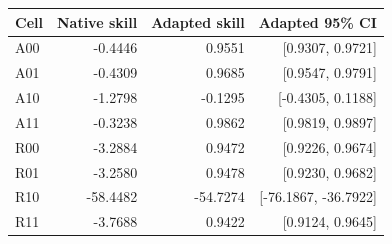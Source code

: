 \begin{tabular}{lrrr}
\toprule
Cell & Native skill & Adapted skill & Adapted 95\% CI \\
\midrule
A00 & -0.4446 & 0.9551 & [0.9307, 0.9721] \\
A01 & -0.4309 & 0.9685 & [0.9547, 0.9791] \\
A10 & -1.2798 & -0.1295 & [-0.4305, 0.1188] \\
A11 & -0.3238 & 0.9862 & [0.9819, 0.9897] \\
R00 & -3.2884 & 0.9472 & [0.9226, 0.9674] \\
R01 & -3.2580 & 0.9478 & [0.9230, 0.9682] \\
R10 & -58.4482 & -54.7274 & [-76.1867, -36.7922] \\
R11 & -3.7688 & 0.9422 & [0.9124, 0.9645] \\
\bottomrule
\end{tabular}

